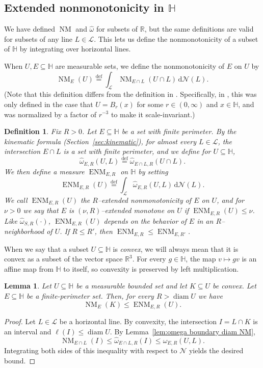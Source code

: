 \documentclass[11pt,reqno]{amsart}
\newcommand{\wwidehat}[1]{\widehat{#1}}
\renewcommand{\H}{\mathbb{H}}
\newcommand{\R}{\mathbb{R}}
\newcommand{\cL}{\mathcal{L}}
\newcommand{\cN}{\mathcal{N}}
\newcommand{\ud}[0]{\,\mathrm{d}}
\newcommand{\0}{\mathbf{0}}
\renewcommand{\1}{\mathbf 1}
\renewcommand{\subset}{\subseteq}
\newcommand{\eqdef}{\stackrel{\mathrm{def}}{=}}
\renewcommand{\le}{\leqslant}
\newtheorem{lemma}[thm]{Lemma}
\newtheorem{defn}[thm]{Definition}
\theoremstyle{remark}
\DeclareMathOperator{\NM}{NM}
\DeclareMathOperator{\ENM}{ENM}
\DeclareMathOperator{\diam}{diam}
\begin{document}
\subsection{Extended nonmonotonicity in $\H$}

We have defined $\NM$ and $\widehat{\omega}$ for subsets of $\R$, but the same definitions are valid for subsets of any line $L\in \cL$.  This lets us define the nonmonotonicity of a subset of $\H$ by integrating over horizontal lines.

When $U, E\subset \H$ are measurable sets, we define the nonmonotonicity of $E$ on $U$ by
$$\NM_{E}(U)\eqdef\int_{\cL} \NM_{E\cap L}(U\cap L)\ud \cN(L).$$
(Note that this definition differs from the definition in \cite{CKN}.  Specifically, in \cite{CKN}, this was only defined in the case that $U=B_r(x)$ for some $r\in (0,\infty)$ and $x\in \H$, and was normalized by a factor of $r^{-3}$ to make it scale-invariant.)

\begin{defn}\label{def:extended monotone} Fix $R>0$.
  Let $E\subset \H$ be a set with finite perimeter.  By the kinematic formula (Section~\ref{sec:kinematic}), for almost every $L\in \cL$, the intersection $E\cap L$ is a set with finite perimeter, and we define for $U\subset \H$,
  \begin{equation}\label{eq:first hat}
  \wwidehat{\omega}_{E,R}(U,L)\eqdef \widehat{\omega}_{E\cap L,R}(U\cap L).
  \end{equation}
We then define a measure $\ENM_{E, R}$ on $\H$ by setting
  $$\ENM_{E, R}(U)\eqdef \int_{\cL}\wwidehat{\omega}_{E,R}(U, L)\ud \cN(L).$$
  We call $\ENM_{E, R}(U)$ the \emph{$R$--extended nonmonotonicity} of $E$ on $U$, and for $\nu>0$ we say that $E$ is \emph{$(\nu,R)$--extended monotone} on $U$ if $\ENM_{E,R}(U)\le \nu$.  Like $\widehat{\omega}_{S,R}(\cdot)$, $\ENM_{E,R}(U)$ depends on the behavior of $E$ in an $R$--neighborhood of $U$. If $R\le R'$, then $\ENM_{E, R}\le \ENM_{E, R'}$.
\end{defn}

When we say that a subset $U\subset \H$ is  \emph{convex}, we will always mean that it is convex as a subset of the vector space $\R^3$.  For every $g\in \H$, the map $v\mapsto gv$ is an affine map from $\H$ to itself, so convexity is preserved by left multiplication.

\begin{lemma}\label{lem:compare NM omega convex}
  Let $U\subset \H$ be a measurable bounded set and let $K\subset U$ be convex.   Let $E\subset \H$ be a finite-perimeter set.  Then, for every $R>\diam U$ we have
  $$\NM_{E}(K) \le \ENM_{E,R}(U).$$
\end{lemma}
\begin{proof}
  Let $L\in \cL$ be a horizontal line.  By convexity, the intersection $I=L\cap K$ is an interval and $\ell(I)\le \diam U$.  By Lemma~\ref{lem:omega boundary diam NM},
  $$\NM_{E\cap L}(I)\le \widehat{\omega}_{E\cap L,R}(I) \le \wwidehat{\omega}_{E,R}(U,L).$$
  Integrating both sides of this inequality with respect to $\cN$ yields the desired bound.
\end{proof}
\end{document}
